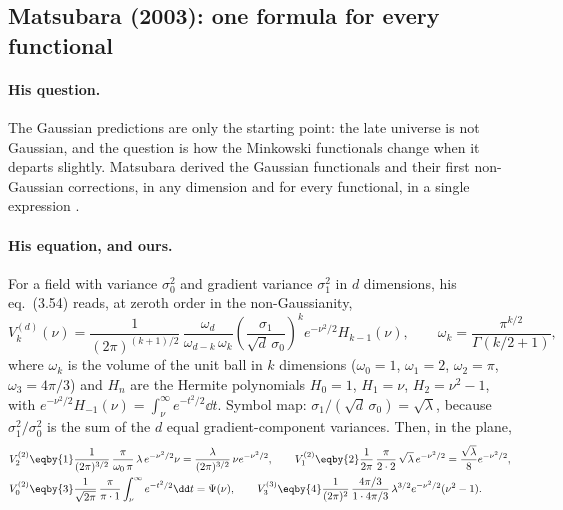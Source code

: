 \subsection{Matsubara (2003): one formula for every functional}
\label{12a:sec:matsubara}

\paragraph{His question.} The Gaussian predictions are only the starting point: the late universe is not
Gaussian, and the question is how the Minkowski functionals change when it departs slightly. Matsubara
derived the Gaussian functionals and their first non-Gaussian corrections, in any dimension and for every
functional, in a single expression \cite{Matsubara2003}.

\paragraph{His equation, and ours.} For a field with variance $\sigma_0^2$ and gradient variance $\sigma_1^2$ in
$d$ dimensions, his eq.~(3.54) reads, at zeroth order in the non-Gaussianity,
\begin{equation}
  V_k^{(d)}(\nu)=\frac{1}{(2\pi)^{(k+1)/2}}\,\frac{\omega_d}{\omega_{d-k}\,\omega_k}
  \left(\frac{\sigma_1}{\sqrt d\,\sigma_0}\right)^{k}e^{-\nu^2/2}H_{k-1}(\nu),
  \qquad \omega_k=\frac{\pi^{k/2}}{\Gamma(k/2+1)},
  \label{12a:eq:matsubara}
\end{equation}
where $\omega_k$ is the volume of the unit ball in $k$ dimensions ($\omega_0=1$, $\omega_1=2$, $\omega_2=\pi$,
$\omega_3=4\pi/3$) and $H_n$ are the Hermite polynomials $H_0=1$, $H_1=\nu$, $H_2=\nu^2-1$, with
$e^{-\nu^2/2}H_{-1}(\nu)=\int_\nu^\infty e^{-t^2/2}\dd t$. Symbol map: $\sigma_1/(\sqrt d\,\sigma_0)=\sqrt\lambda$,
because $\sigma_1^2/\sigma_0^2$ is the sum of the $d$ equal gradient-component variances. Then, in the plane,
\begin{align}
  V_2^{(2)}
  &\eqby{1}\frac{1}{(2\pi)^{3/2}}\,\frac{\pi}{\omega_0\,\pi}\,\lambda\,e^{-\nu^2/2}\nu
   =\frac{\lambda}{(2\pi)^{3/2}}\,\nu e^{-\nu^2/2},
  \qquad
  V_1^{(2)}\eqby{2}\frac{1}{2\pi}\,\frac{\pi}{2\cdot2}\,\sqrt\lambda\,e^{-\nu^2/2}=\frac{\sqrt\lambda}{8}e^{-\nu^2/2},
  \nonumber\\
  V_0^{(2)}
  &\eqby{3}\frac{1}{\sqrt{2\pi}}\,\frac{\pi}{\pi\cdot1}\int_\nu^\infty e^{-t^2/2}\dd t=\Psi(\nu),
  \qquad
  V_3^{(3)}\eqby{4}\frac{1}{(2\pi)^2}\,\frac{4\pi/3}{1\cdot4\pi/3}\,\lambda^{3/2}e^{-\nu^2/2}(\nu^2-1).
  \label{12a:eq:matsubara-check}
\end{align}
